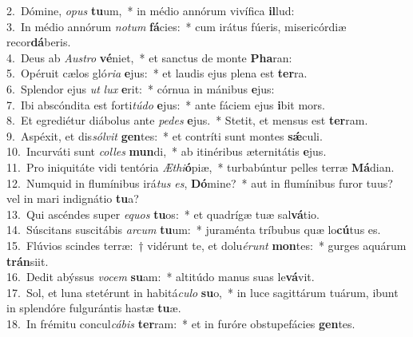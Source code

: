 {2.~}Dómine, \textit{o}\textit{pus} \textbf{tu}um,~* in médio annórum vivífica \textbf{il}lud:\\
{3.~}In médio annórum \textit{no}\textit{tum} \textbf{fá}cies:~* cum irátus fúeris, misericórdiæ recor\textbf{dá}beris.\\
{4.~}Deus ab \textit{Au}\textit{stro} \textbf{vé}niet,~* et sanctus de monte \textbf{Pha}ran:\\
{5.~}Opéruit cælos gló\textit{ri}\textit{a} \textbf{e}jus:~* et laudis ejus plena est \textbf{ter}ra.\\
{6.~}Splendor ejus \textit{ut} \textit{lux} \textbf{e}rit:~* córnua in mánibus \textbf{e}jus:\\
{7.~}Ibi abscóndita est forti\textit{tú}\textit{do} \textbf{e}jus:~* ante fáciem ejus \textbf{i}bit mors.\\
{8.~}Et egrediétur diábolus ante \textit{pe}\textit{des} \textbf{e}jus.~* Stetit, et mensus est \textbf{ter}ram.\\
{9.~}Aspéxit, et dis\textit{sól}\textit{vit} \textbf{gen}tes:~* et contríti sunt montes \textbf{sǽ}culi.\\
{10.~}Incurváti sunt \textit{col}\textit{les} \textbf{mun}di,~* ab itinéribus æternitátis \textbf{e}jus.\\
{11.~}Pro iniquitáte vidi tentória \textit{Æ}\textit{thi}\textbf{ó}piæ,~* turbabúntur pelles terræ \textbf{Má}dian.\\
{12.~}Numquid in flumínibus irá\textit{tus} \textit{es}, \textbf{Dó}mine?~* aut in flumínibus furor tuus? vel in mari indignátio \textbf{tu}a?\\
{13.~}Qui ascéndes super \textit{e}\textit{quos} \textbf{tu}os:~* et quadrígæ tuæ sal\textbf{vá}tio.\\
{14.~}Súscitans suscitábis \textit{ar}\textit{cum} \textbf{tu}um:~* juraménta tríbubus quæ lo\textbf{cú}tus es.\\
{15.~}Flúvios scindes terræ:~† vidérunt te, et dolu\textit{é}\textit{runt} \textbf{mon}tes:~* gurges aquárum \textbf{trán}siit.\\
{16.~}Dedit abýssus \textit{vo}\textit{cem} \textbf{su}am:~* altitúdo manus suas le\textbf{vá}vit.\\
{17.~}Sol, et luna stetérunt in habitá\textit{cu}\textit{lo} \textbf{su}o,~* in luce sagittárum tuárum, ibunt in splendóre fulgurántis hastæ \textbf{tu}æ.\\
{18.~}In frémitu concul\textit{cá}\textit{bis} \textbf{ter}ram:~* et in furóre obstupefácies \textbf{gen}tes.\\
